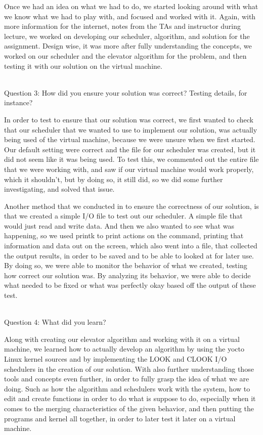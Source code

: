 \documentclass[10pt,journal,onecolumn,compsoc]{IEEEtran}
\begin{document}
Once we had an idea on what we had to do, we started looking around with what we know what we had to play with, and focused and worked with it. Again, with more information for the internet, notes from the TAs and instructor during lecture, we worked on developing our scheduler, algorithm, and solution for the assignment. Design wise, it was more after fully understanding the concepts, we worked on our scheduler and the elevator algorithm for the problem, and then testing it with our solution on the virtual machine.\\ ~ \par

\noindent Question 3: How did you ensure your solution was correct? Testing details, for instance?\par 
In order to test to ensure that our solution was correct, we first wanted to check that our scheduler that we wanted to use to implement our solution, was actually being used of the virtual machine, because we were unsure when we first started. Our default setting were correct and the file for our scheduler was created, but it did not seem like it was being used. To test this, we commented out the entire file that we were working with, and saw if our virtual machine would work properly, which it shouldn't, but by doing so, it still did, so we did some further investigating, and solved that issue. 

Another method that we conducted in to ensure the correctness of our solution, is that we created a simple I/O file to test out our scheduler. A simple file that would just read and write data. And then we also wanted to see what was happening, so we used printk to print actions on the command, printing that information and data out on the screen, which also went into a file, that collected the output results, in order to be saved and to be able to looked at for later use. By doing so, we were able to monitor the behavior of what we created, testing how correct our solution was. By analyzing its behavior, we were able to decide what needed to be fixed or what was perfectly okay based off the output of these test.\\ ~ \par

\noindent Question 4: What did you learn?\par
Along with creating our elevator algorithm and working with it on a virtual machine, we learned how to actually develop an algorithm by using the yocto Linux kernel sources and by implementing the LOOK and CLOOK I/O schedulers in the creation of our solution. With also further understanding those tools and concepts even further, in order to fully grasp the idea of what we are doing. Such as how the algorithm and schedulers work with the system, how to edit and create functions in order to do what is suppose to do, especially when it comes to the merging characteristics of the given behavior, and then putting the programs and kernel all together, in order to later test it later on a virtual machine.\\ ~ \par
\end{document}
